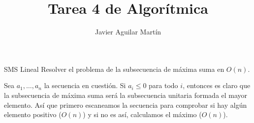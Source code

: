 \documentclass[twoside]{article}
\begin{document}
\title{Tarea 4 de Algorítmica}
\author{Javier Aguilar Martín}
\maketitle


\begin{ejercicio}{SMS Lineal}
Resolver el problema de la subsecuencia de máxima suma en $O(n)$.
\end{ejercicio}
\begin{solucion}
Sea $a_1,\dots, a_n$ la secuencia en cuestión. Si $a_i\leq 0$ para todo $i$, entonces es claro que la subsecuencia de máxima suma será la subsecuencia unitaria formada el mayor elemento. Así que primero escaneamos la secuencia para comprobar si hay algún elemento positivo ($O(n)$) y si no es así, calculamos el máximo ($O(n)$). 


%


\end{solucion}
\end{document}
